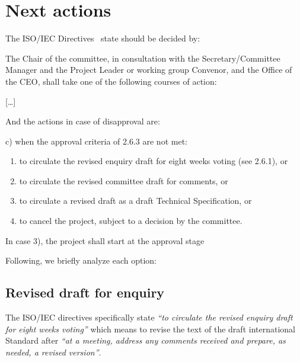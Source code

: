 \section{Next actions}

The ISO/IEC Directives~\cite{jtc1:directives} state should be decided by:

\vspace{1em}
\begin{tcolorbox}[
  colback=blue!8!white,
  colframe=blue,
  title={\textbf{Section 2.6.4 from ISO/IEC JTC1 Directives}},
  breakable,
  width=\textwidth,
  boxrule=0.5pt
  ]
[\ldots] 

The Chair of the committee, in consultation with the
Secretary/Committee Manager and the Project Leader or working group Convenor,
and the Office of the CEO, shall take one of the following courses of action:

[\ldots]
\end{tcolorbox}

And the actions in case of disapproval are:

\vspace{1em}
\begin{tcolorbox}[
  colback=blue!8!white,
  colframe=blue,
  title={\textbf{Section 2.6.4 from ISO/IEC JTC1 Directives}},
  breakable,
  width=\textwidth,
  boxrule=0.5pt
  ]
[\ldots] 

c) when the approval criteria of 2.6.3 are not met:
\begin{enumerate}
\item to circulate the revised enquiry draft for eight weeks voting (see 2.6.1), or
\item to circulate the revised committee draft for comments, or
\item to circulate a revised draft as a draft Technical Specification, or
\item to cancel the project, subject to a decision by the committee.
\end{enumerate}

In case 3), the project shall start at the approval stage
\end{tcolorbox}

Following, we briefly analyze each option:

\subsection{Revised draft for enquiry}

The ISO/IEC directives specifically state \emph{``to circulate the revised
enquiry draft for eight weeks voting''} which means to revise the text of the
draft international Standard after \emph{``at a meeting, address any comments
received and prepare, as needed, a revised version''}.


